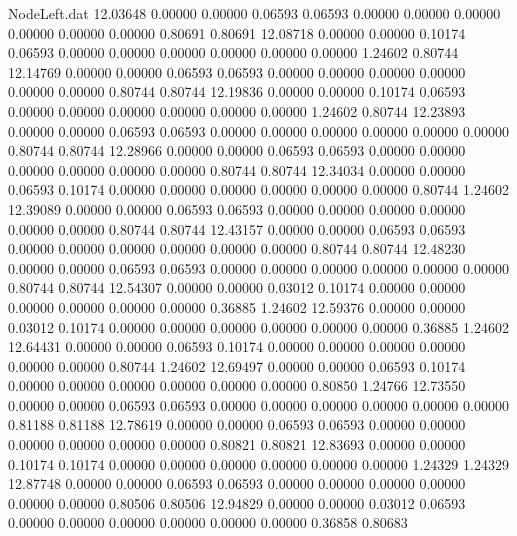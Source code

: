 \begin{filecontents}{NodeLeft.dat}
  12.03648    0.00000    0.00000     0.06593    0.06593    0.00000    0.00000    0.00000    0.00000    0.00000    0.00000    0.80691    0.80691
  12.08718    0.00000    0.00000     0.10174    0.06593    0.00000    0.00000    0.00000    0.00000    0.00000    0.00000    1.24602    0.80744
  12.14769    0.00000    0.00000     0.06593    0.06593    0.00000    0.00000    0.00000    0.00000    0.00000    0.00000    0.80744    0.80744
  12.19836    0.00000    0.00000     0.10174    0.06593    0.00000    0.00000    0.00000    0.00000    0.00000    0.00000    1.24602    0.80744
  12.23893    0.00000    0.00000     0.06593    0.06593    0.00000    0.00000    0.00000    0.00000    0.00000    0.00000    0.80744    0.80744
  12.28966    0.00000    0.00000     0.06593    0.06593    0.00000    0.00000    0.00000    0.00000    0.00000    0.00000    0.80744    0.80744
  12.34034    0.00000    0.00000     0.06593    0.10174    0.00000    0.00000    0.00000    0.00000    0.00000    0.00000    0.80744    1.24602
  12.39089    0.00000    0.00000     0.06593    0.06593    0.00000    0.00000    0.00000    0.00000    0.00000    0.00000    0.80744    0.80744
  12.43157    0.00000    0.00000     0.06593    0.06593    0.00000    0.00000    0.00000    0.00000    0.00000    0.00000    0.80744    0.80744
  12.48230    0.00000    0.00000     0.06593    0.06593    0.00000    0.00000    0.00000    0.00000    0.00000    0.00000    0.80744    0.80744
  12.54307    0.00000    0.00000     0.03012    0.10174    0.00000    0.00000    0.00000    0.00000    0.00000    0.00000    0.36885    1.24602
  12.59376    0.00000    0.00000     0.03012    0.10174    0.00000    0.00000    0.00000    0.00000    0.00000    0.00000    0.36885    1.24602
  12.64431    0.00000    0.00000     0.06593    0.10174    0.00000    0.00000    0.00000    0.00000    0.00000    0.00000    0.80744    1.24602
  12.69497    0.00000    0.00000     0.06593    0.10174    0.00000    0.00000    0.00000    0.00000    0.00000    0.00000    0.80850    1.24766
  12.73550    0.00000    0.00000     0.06593    0.06593    0.00000    0.00000    0.00000    0.00000    0.00000    0.00000    0.81188    0.81188
  12.78619    0.00000    0.00000     0.06593    0.06593    0.00000    0.00000    0.00000    0.00000    0.00000    0.00000    0.80821    0.80821
  12.83693    0.00000    0.00000     0.10174    0.10174    0.00000    0.00000    0.00000    0.00000    0.00000    0.00000    1.24329    1.24329
  12.87748    0.00000    0.00000     0.06593    0.06593    0.00000    0.00000    0.00000    0.00000    0.00000    0.00000    0.80506    0.80506
  12.94829    0.00000    0.00000     0.03012    0.06593    0.00000    0.00000    0.00000    0.00000    0.00000    0.00000    0.36858    0.80683

\end{filecontents}
